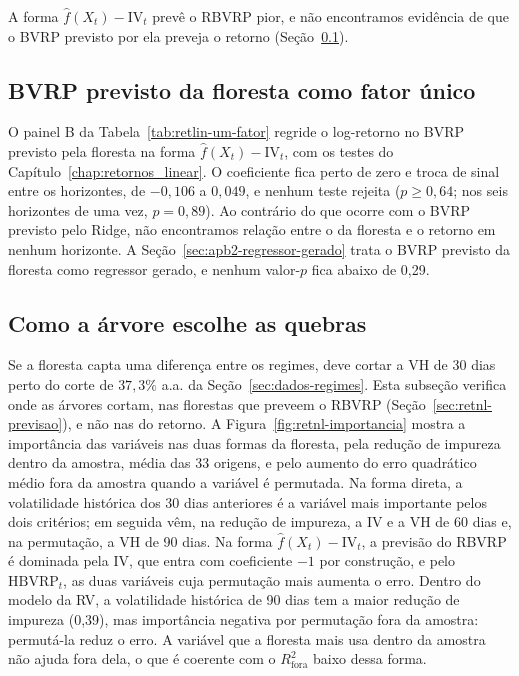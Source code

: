 

A forma $\hat f(X_t) - \text{IV}_t$ prevê o RBVRP pior, e não encontramos evidência
de que o BVRP previsto por ela preveja o retorno (Seção~\ref{sec:retnl-fator}).

\subsection{BVRP previsto da floresta como fator único}
\label{sec:retnl-fator}

O painel B da Tabela~\ref{tab:retlin-um-fator} regride o log-retorno no BVRP
previsto pela floresta na forma $\hat f(X_t) - \text{IV}_t$, com os testes
do Capítulo~\ref{chap:retornos_linear}. O coeficiente fica perto de zero e
troca de sinal entre os horizontes, de $-0{,}106$ a $0{,}049$, e nenhum teste
rejeita ($p \ge 0{,}64$; nos seis horizontes de uma vez, $p = 0{,}89$). Ao
contrário do que ocorre com o BVRP previsto pelo Ridge, não encontramos
relação entre o da floresta e o retorno em nenhum horizonte. A Seção~\ref{sec:apb2-regressor-gerado} trata o
BVRP previsto da floresta como regressor gerado, e nenhum valor-$p$ fica
abaixo de 0,29.

\subsection{Como a árvore escolhe as quebras}
\label{sec:retnl-quebras}

Se a floresta capta uma diferença entre os regimes, deve cortar a VH de 30
dias perto do corte de $37{,}3\%$ a.a. da Seção~\ref{sec:dados-regimes}. Esta
subseção verifica onde as árvores cortam, nas florestas que preveem o RBVRP
(Seção~\ref{sec:retnl-previsao}), e não nas do retorno.
A Figura~\ref{fig:retnl-importancia} mostra a importância das variáveis nas
duas formas da floresta, pela redução de impureza dentro da amostra, média
das 33 origens, e pelo aumento do erro quadrático médio fora da amostra
quando a variável é permutada. Na forma direta, a volatilidade histórica dos
30 dias anteriores é a variável mais importante pelos dois critérios; em
seguida vêm, na redução de impureza, a IV e a VH de 60 dias e, na permutação,
a VH de 90 dias. Na forma $\hat f(X_t) - \text{IV}_t$, a previsão do RBVRP é
dominada pela IV, que entra com coeficiente $-1$ por construção, e pelo
$\text{HBVRP}_t$, as duas variáveis cuja permutação mais aumenta
o erro. Dentro do modelo da RV, a volatilidade histórica de 90 dias tem a
maior redução de impureza (0,39), mas importância negativa por permutação fora
da amostra: permutá-la reduz o erro. A variável que a floresta mais usa
dentro da amostra não ajuda fora dela, o que é coerente com o
$R^2_{\text{fora}}$ baixo dessa forma.


